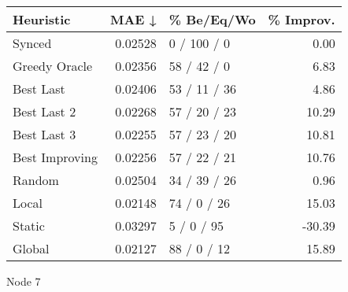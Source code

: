 \begin{tabular}{lrlr}
\toprule
\textbf{Heuristic} & \textbf{MAE ↓} & \textbf{\% Be/Eq/Wo} & \textbf{\% Improv.} \\
\midrule
            Synced &        0.02528 &          0 / 100 / 0 &                0.00 \\
     Greedy Oracle &        0.02356 &          58 / 42 / 0 &                6.83 \\
         Best Last &        0.02406 &         53 / 11 / 36 &                4.86 \\
       Best Last 2 &        0.02268 &         57 / 20 / 23 &               10.29 \\
       Best Last 3 &        0.02255 &         57 / 23 / 20 &               10.81 \\
    Best Improving &        0.02256 &         57 / 22 / 21 &               10.76 \\
            Random &        0.02504 &         34 / 39 / 26 &                0.96 \\
             Local &        0.02148 &          74 / 0 / 26 &               15.03 \\
            Static &        0.03297 &           5 / 0 / 95 &              -30.39 \\
            Global &        0.02127 &          88 / 0 / 12 &               15.89 \\
\bottomrule
\end{tabular}
\caption{Node 7}
\label{tab:non_lr01_le1_bs4_7}
